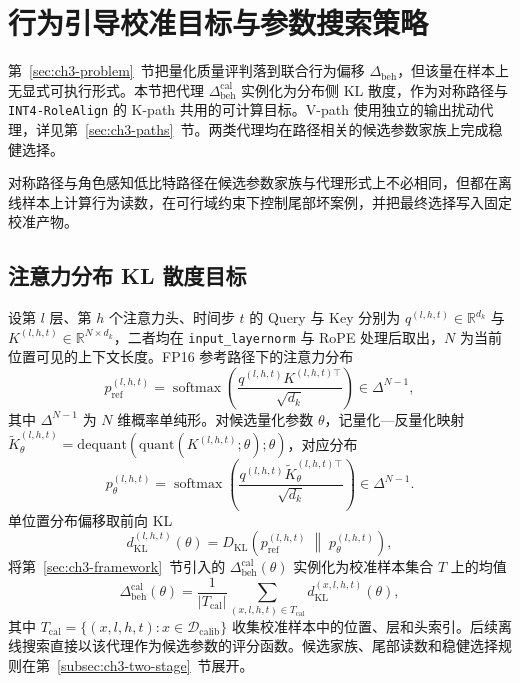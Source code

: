 

\section{行为引导校准目标与参数搜索策略}
\label{sec:ch3-calibration}

第~\ref{sec:ch3-problem}~节把量化质量评判落到联合行为偏移 $\Delta_{\mathrm{beh}}$，但该量在样本上无显式可执行形式。本节把代理 $\Delta_{\mathrm{beh}}^{\mathrm{cal}}$ 实例化为分布侧 KL 散度，作为对称路径与 \texttt{INT4-RoleAlign} 的 K-path 共用的可计算目标。V-path 使用独立的输出扰动代理，详见第~\ref{sec:ch3-paths}~节。两类代理均在路径相关的候选参数家族上完成稳健选择。

对称路径与角色感知低比特路径在候选参数家族与代理形式上不必相同，但都在离线样本上计算行为读数，在可行域约束下控制尾部坏案例，并把最终选择写入固定校准产物。

\subsection{注意力分布 KL 散度目标}
\label{subsec:ch3-kl-target}

设第 $l$ 层、第 $h$ 个注意力头、时间步 $t$ 的 Query 与 Key 分别为 $q^{(l,h,t)}\in\mathbb{R}^{d_k}$ 与 $K^{(l,h,t)}\in\mathbb{R}^{N\times d_k}$，二者均在 \texttt{input\_layernorm} 与 RoPE 处理后取出，$N$ 为当前位置可见的上下文长度。FP16 参考路径下的注意力分布
\begin{equation}
p_{\mathrm{ref}}^{(l,h,t)}
=
\operatorname{softmax}\!\left(
\frac{q^{(l,h,t)} K^{(l,h,t)\top}}{\sqrt{d_k}}
\right)\in\Delta^{N-1},
\end{equation}
其中 $\Delta^{N-1}$ 为 $N$ 维概率单纯形。对候选量化参数 $\theta$，记量化—反量化映射 $\tilde K_{\theta}^{(l,h,t)} = \mathrm{dequant}(\mathrm{quant}(K^{(l,h,t)};\theta);\theta)$，对应分布
\begin{equation}
p_{\theta}^{(l,h,t)}
=
\operatorname{softmax}\!\left(
\frac{q^{(l,h,t)} \tilde K_{\theta}^{(l,h,t)\top}}{\sqrt{d_k}}
\right)\in\Delta^{N-1}.
\end{equation}
单位置分布偏移取前向 KL
\begin{equation}
d_{\mathrm{KL}}^{(l,h,t)}(\theta)
=
D_{\mathrm{KL}}\!\left(
p_{\mathrm{ref}}^{(l,h,t)}
\;\middle\|\;
p_{\theta}^{(l,h,t)}
\right),
\end{equation}
将第~\ref{sec:ch3-framework}~节引入的 $\Delta_{\mathrm{beh}}^{\mathrm{cal}}(\theta)$ 实例化为校准样本集合 $T$ 上的均值
\begin{equation}
\Delta_{\mathrm{beh}}^{\mathrm{cal}}(\theta)
=
\frac{1}{|T_{\mathrm{cal}}|}\sum_{(x,l,h,t)\in T_{\mathrm{cal}}} d_{\mathrm{KL}}^{(x,l,h,t)}(\theta),
\end{equation}
其中 $T_{\mathrm{cal}}=\{(x,l,h,t):x\in\mathcal D_{\mathrm{calib}}\}$ 收集校准样本中的位置、层和头索引。后续离线搜索直接以该代理作为候选参数的评分函数。候选家族、尾部读数和稳健选择规则在第~\ref{subsec:ch3-two-stage}~节展开。

